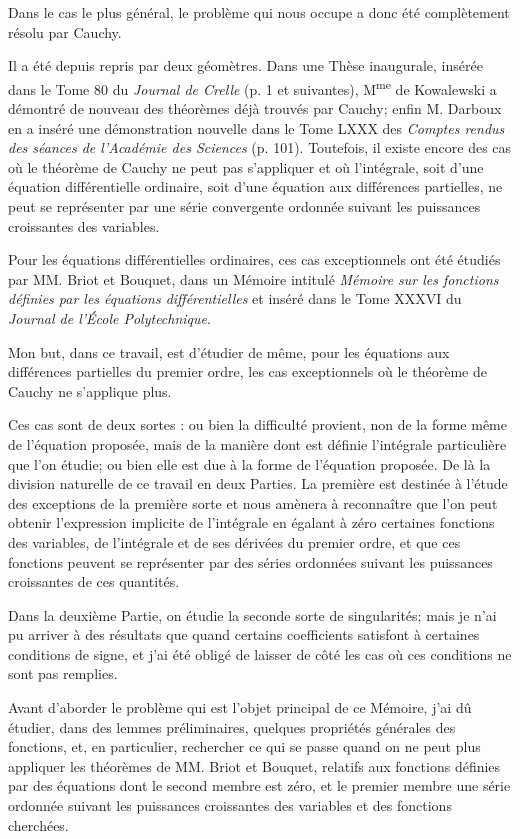 \documentclass[11pt]{article}
\begin{document}
Dans le cas le plus général, le problème qui nous occupe a donc été complètement résolu par Cauchy.

Il a été depuis repris par deux géomètres. Dans une Thèse inaugurale, insérée dans le Tome 80 du \emph{Journal de Crelle} (p. 1 et suivantes), M\textsuperscript{me} de Kowalewski a démontré de nouveau des théorèmes déjà trouvés par Cauchy; enfin M. Darboux en a inséré une démonstration nouvelle dans le Tome LXXX des \emph{Comptes rendus des séances de l'Académie des Sciences} (p. 101). Toutefois, il existe encore des cas où le théorème de Cauchy ne peut pas s'appliquer et où l'intégrale, soit d'une équation différentielle ordinaire, soit d'une équation aux différences partielles, ne peut se représenter par une série convergente ordonnée suivant les puissances croissantes des variables.

Pour les équations différentielles ordinaires, ces cas exceptionnels ont été étudiés par MM. Briot et Bouquet, dans un Mémoire intitulé \emph{Mémoire sur les fonctions définies par les équations différentielles} et inséré dans le Tome XXXVI du \emph{Journal de l'École Polytechnique}.

Mon but, dans ce travail, est d'étudier de même, pour les équations aux différences partielles du premier ordre, les cas exceptionnels où le théorème de Cauchy ne s'applique plus.

Ces cas sont de deux sortes : ou bien la difficulté provient, non de la forme même de l'équation proposée, mais de la manière dont est définie l'intégrale particulière que l'on étudie; ou bien elle est due à la forme de l'équation proposée. De là la division naturelle de ce travail en deux Parties. La première est destinée à l'étude des exceptions de la première sorte et nous amènera à reconnaître que l'on peut obtenir l'expression implicite de l'intégrale en égalant à zéro certaines fonctions des variables, de l'intégrale et de ses dérivées du premier ordre, et que ces fonctions peuvent se représenter par des séries ordonnées suivant les puissances croissantes de ces quantités.

Dans la deuxième Partie, on étudie la seconde sorte de singularités; mais je n'ai pu arriver à des résultats que quand certains coefficients satisfont à certaines conditions de signe, et j'ai été obligé de laisser de côté les cas où ces conditions ne sont pas remplies.

Avant d'aborder le problème qui est l'objet principal de ce Mémoire, j'ai dû étudier, dans des lemmes préliminaires, quelques propriétés générales des fonctions, et, en particulier, rechercher ce qui se passe quand on ne peut plus appliquer les théorèmes de MM. Briot et Bouquet, relatifs aux fonctions définies par des équations dont le second membre est zéro, et le premier membre une série ordonnée suivant les puissances croissantes des variables et des fonctions cherchées.
\end{document}
